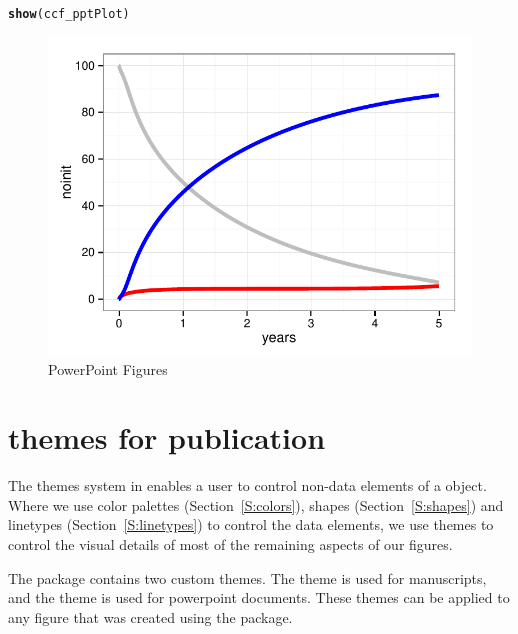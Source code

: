\documentclass[nojss]{jss}\usepackage[]{graphicx}\usepackage[]{color}
\makeatletter
\def\maxwidth{ %
  \ifdim\Gin@nat@width>\linewidth
    \linewidth
  \else
    \Gin@nat@width
  \fi
}
\newcommand{\hlstd}[1]{\textcolor[rgb]{0.345,0.345,0.345}{#1}}%
\newcommand{\hlkwd}[1]{\textcolor[rgb]{0.737,0.353,0.396}{\textbf{#1}}}%
\newenvironment{kframe}{%
 \def\at@end@of@kframe{}%
 \ifinner\ifhmode%
  \def\at@end@of@kframe{\end{minipage}}%
  \begin{minipage}{\columnwidth}%
 \fi\fi%
 \def\FrameCommand##1{\hskip\@totalleftmargin \hskip-\fboxsep
 \colorbox{shadecolor}{##1}\hskip-\fboxsep
     \hskip-\linewidth \hskip-\@totalleftmargin \hskip\columnwidth}%
 \MakeFramed {\advance\hsize-\width
   \@totalleftmargin\z@ \linewidth\hsize
   \@setminipage}}%
 {\par\unskip\endMakeFramed%
 \at@end@of@kframe}
\newenvironment{knitrout}{}{} %
\makeatother
\begin{document}
\begin{knitrout}
\begin{kframe}
\begin{alltt}
\hlkwd{show}\hlstd{(ccf_pptPlot)}
\end{alltt}
\end{kframe}\begin{figure}[htpb]

{\centering \includegraphics[width=\maxwidth]{figure/beamer-powerpoint-1} 

}

\caption[PowerPoint Figures]{PowerPoint Figures\label{F:powerpoint}}
\end{figure}


\end{knitrout}


\section[Themes for publications]{ themes for publication}\label{S:themes}
The themes system in  enables a user to control non-data elements of a  object. Where we use color palettes (Section~\ref{S:colors}), shapes (Section~\ref{S:shapes}) and linetypes (Section~\ref{S:linetypes}) to control the data elements, we use themes to control the visual details of most of the remaining aspects of our figures. 

The  package contains two custom themes. The  theme is used for manuscripts, and the  theme is used for powerpoint documents. These themes can be applied to any figure that was created using the  package.  
\end{document}
